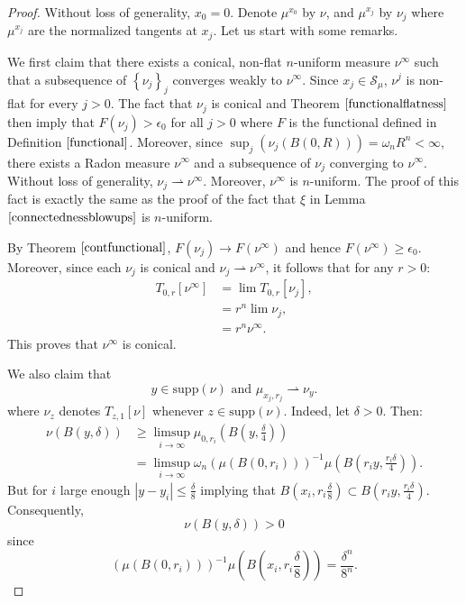 \documentclass[11pt]{article}
\theoremstyle{definition}
\theoremstyle{remark}
\numberwithin{equation}{section}
\begin{document}
\begin{proof}
Without loss of generality, $x_0 = 0$. Denote $\mu^{x_0}$ by $\nu$, and $\mu^{x_j}$ by $\nu_j$ where $\mu^{x_j}$ are the normalized tangents at $x_j$.
Let us start with some remarks.

We first claim that there exists a conical, non-flat $n$-uniform measure $\nu^{\infty}$ such that a subsequence of $\left\lbrace \nu_{j} \right\rbrace_j$ converges weakly to $\nu^{\infty}$.
Since $x_j \in \mathcal{S}_{\mu}$, $\nu^{j}$ is non-flat for every $j>0$. The fact that $\nu_{j}$ is conical and Theorem $\ref{functionalflatness}$ then imply that  $F(\nu_j) > \epsilon_{0}$ for all $j>0$ where $F$ is the functional defined in Definition $\ref{functional}$.
Moreover, since $\sup_{j}(\nu_j(B(0,R)) )= \omega_{n} R^{n}< \infty$, there exists a Radon measure $\nu^{\infty}$ and a subsequence of $\nu_j$ converging to $\nu^{\infty}$. Without loss of generality, $\nu_j \rightharpoonup \nu^{\infty}$.
Moreover, $\nu^{\infty}$ is $n$-uniform. The proof of this fact is exactly the same as the proof of the fact that $\xi$ in Lemma $\ref{connectednessblowups}$ is $n$-uniform.

By Theorem $\ref{contfunctional}$, $F(\nu_{j}) \to F(\nu^{\infty})$ and hence $F(\nu^{\infty}) \geq \epsilon_{0}$.
Moreover, since each $\nu_{j}$ is conical and $\nu_{j} \rightharpoonup \nu^{\infty}$, it follows that for any $r>0$:
\begin{align*}
T_{0,r}[ \nu^{\infty}] &= \lim T_{0,r}[\nu_{j}], \\
&=r^{n} \lim \nu_{j}, \\
&=r^{n} \nu^{\infty}.
\end{align*}
This proves that $\nu^{\infty}$ is conical.

We also claim that 
\begin{equation} \label{nuy}
y \in \mbox{supp}(\nu) \mbox{ and } \mu_{x_j , r_j} \rightharpoonup \nu_{y}. 
\end{equation} where  $\nu_{z}$ denotes $T_{z,1}[\nu]$ whenever $z \in \mbox{supp}(\nu)$. 
 Indeed, let $\delta > 0$.
Then:
\begin{align*}
\nu(B(y,\delta)) & \geq \limsup_{i \to \infty} \mu_{0,r_i}\left(B\left(y,\frac{\delta}{4}\right)\right) \\ & =\limsup_{i \to \infty} \omega_{n}(\mu(B(0,r_i)))^{-1} \mu\left(B\left(r_i y, \frac{r_i \delta}{4}\right)\right).
\end{align*}
But for $i$ large enough $|y-y_i| \leq \frac{\delta}{8}$ implying that $B(x_{i}, r_i \frac{\delta}{8}) \subset B(r_i y, \frac{r_i \delta}{4})$. Consequently, $$\nu(B(y,\delta)) >0$$ since $$(\mu(B(0,r_i)))^{-1} \mu\left(B(x_{i}, r_i \frac{\delta}{8})\right) = \frac{\delta^{n}}{8^n}.$$


\end{proof}
\end{document}
